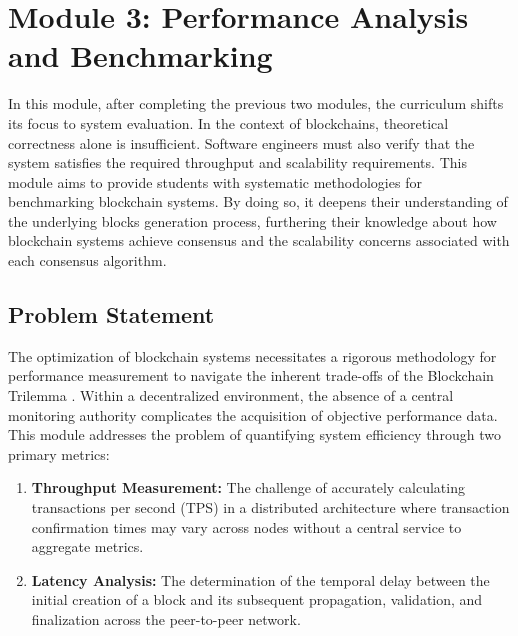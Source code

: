 \newpage

\section{Module 3: Performance Analysis and Benchmarking} \label{ch5_module3}
In this module, after completing the previous two modules, the curriculum shifts its focus to system evaluation. In the context of blockchains, theoretical correctness alone is insufficient. Software engineers must also verify that the system satisfies the required throughput and scalability requirements. This module aims to provide students with systematic methodologies for benchmarking blockchain systems. By doing so, it deepens their understanding of the underlying blocks generation process, furthering their knowledge about how blockchain systems achieve consensus and the scalability concerns associated with each consensus algorithm.

\subsection{Problem Statement}
The optimization of blockchain systems necessitates a rigorous methodology for performance measurement to navigate the inherent trade-offs of the Blockchain Trilemma \cite{blockchainTrilemma}. Within a decentralized environment, the absence of a central monitoring authority complicates the acquisition of objective performance data. This module addresses the problem of quantifying system efficiency through two primary metrics:
\begin{enumerate}
    \item \textbf{Throughput Measurement:} The challenge of accurately calculating transactions per second (TPS) in a distributed architecture where transaction confirmation times may vary across nodes without a central service to aggregate metrics.
    \item \textbf{Latency Analysis:} The determination of the temporal delay between the initial creation of a block and its subsequent propagation, validation, and finalization across the peer-to-peer network.
\end{enumerate}

